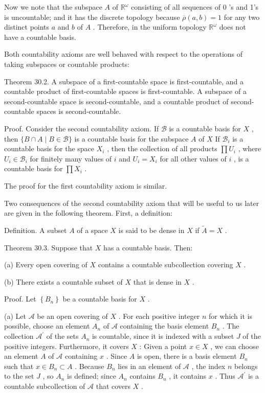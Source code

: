 \documentclass[10pt]{article}
\begin{document}
Now we note that the subspace \(A\) of \({\mathbb{R}}^{\omega }\) consisting of all sequences of 0 ’s and 1’s is uncountable; and it has the discrete topology because \(\overline{\rho }\left( {a,b}\right)  = 1\) for any two distinct points \(a\) and \(b\) of \(A\) . Therefore, in the uniform topology \({\mathbb{R}}^{\omega }\) does not have a countable basis.

Both countability axioms are well behaved with respect to the operations of taking subspaces or countable products:

Theorem 30.2. A subspace of a first-countable space is first-countable, and a countable product of first-countable spaces is first-countable. A subspace of a second-countable space is second-countable, and a countable product of second-countable spaces is second-countable.

Proof. Consider the second countability axiom. If \(\mathcal{B}\) is a countable basis for \(X\) , then \(\{ B \cap  A \mid  B \in  \mathcal{B}\}\) is a countable basis for the subspace \(A\) of \(X\) If \({\mathcal{B}}_{i}\) is a countable basis for the space \({X}_{i}\) , then the collection of all products \(\prod {U}_{i}\) , where \({U}_{i} \in  {\mathcal{B}}_{i}\) for finitely many values of \(i\) and \({U}_{i} = {X}_{i}\) for all other values of \(i\) , is a countable basis for \(\prod {X}_{i}\) .

The proof for the first countability axiom is similar.

Two consequences of the second countability axiom that will be useful to us later are given in the following theorem. First, a definition:

Definition. A subset \(A\) of a space \(X\) is said to be dense in \(X\) if \(\widetilde{A} = X\) .

Theorem 30.3. Suppose that \(X\) has a countable basis. Then:

(a) Every open covering of \(X\) contains a countable subcollection covering \(X\) .

(b) There exists a countable subset of \(X\) that is dense in \(X\) .

Proof. Let \(\left\{  {B}_{n}\right\}\) be a countable basis for \(X\) .

(a) Let \(\mathcal{A}\) be an open covering of \(X\) . For each positive integer \(n\) for which it is possible, choose an element \({A}_{n}\) of \(\mathcal{A}\) containing the basis element \({B}_{n}\) . The collection \({\mathcal{A}}^{\prime }\) of the sets \({A}_{n}\) is countable, since it is indexed with a subset \(J\) of the positive integers. Furthermore, it covers \(X\) : Given a point \(x \in  X\) , we can choose an element \(A\) of \(\mathcal{A}\) containing \(x\) . Since \(A\) is open, there is a basis element \({B}_{n}\) such that \(x \in  {B}_{n} \subset  A\) . Because \({B}_{n}\) lies in an element of \(\mathcal{A}\) , the index \(n\) belongs to the set \(J\) , so \({A}_{n}\) is defined; since \({A}_{n}\) contains \({B}_{n}\) , it contains \(x\) . Thus \({\mathcal{A}}^{\prime }\) is a countable subcollection of \(\mathcal{A}\) that covers \(X\) .
\end{document}
